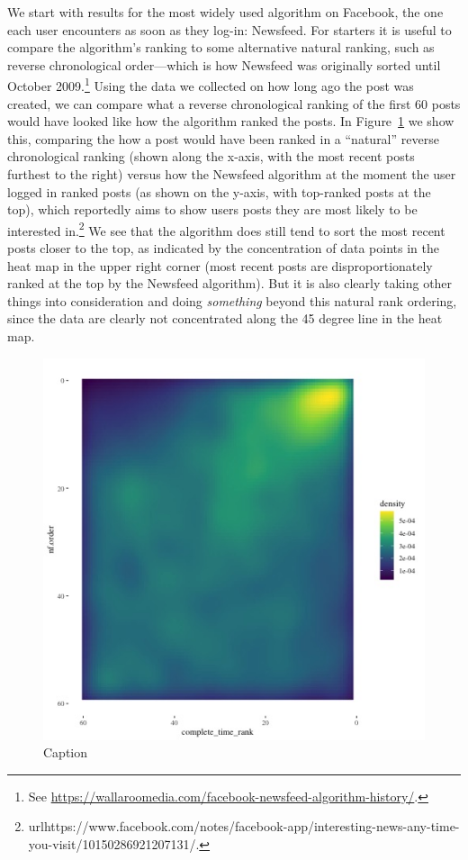 \documentclass[12pt,letterpaper]{article}
\begin{document}
We start with results for the most widely used algorithm on Facebook, the one each user encounters as soon as they log-in: Newsfeed. For starters it is useful to compare the algorithm's ranking to some alternative natural ranking, such as reverse chronological order---which is how Newsfeed was originally sorted until October 2009.\footnote{See \url{https://wallaroomedia.com/facebook-newsfeed-algorithm-history/}.} Using the data we collected on how long ago the post was created, we can compare what a reverse chronological ranking of the first 60 posts would have looked like how the algorithm ranked the posts. In Figure~\ref{fig:nftime} we show this, comparing the how a post would have been ranked in a ``natural'' reverse chronological ranking (shown along the x-axis, with the most recent posts furthest to the right) versus how the Newsfeed algorithm at the moment the user logged in ranked posts (as shown on the y-axis, with top-ranked posts at the top), which reportedly aims to show users posts they are most likely to be interested in.\footnote{url{https://www.facebook.com/notes/facebook-app/interesting-news-any-time-you-visit/10150286921207131/}.} We see that the algorithm does still tend to sort the most recent posts closer to the top, as indicated by the concentration of data points in the heat map in the upper right corner (most recent posts are disproportionately ranked at the top by the Newsfeed algorithm). But it is also clearly taking other things into consideration and doing \emph{something} beyond this natural rank ordering, since the data are clearly not concentrated along the 45 degree line in the heat map.

\begin{figure}[!h]
    \centering
    \includegraphics[scale=.8]{Output/Graphs/Audit/Heatmaps/US NF chron rank by nf rank - smooth.jpg}
    \caption{Caption}
    \label{fig:nftime}
\end{figure}
\end{document}
